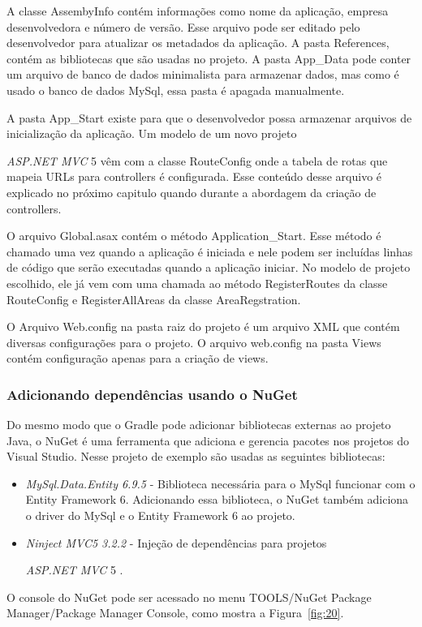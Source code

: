 \documentclass[a4paper,12pt]{article}
\newcommand{\anmvc} {
\sigla{ASP.NET MVC} 5
}
\newcommand{\sigla}[1] {
	\textit{#1}
}
\newcommand{\lib}[1] {
	\textit{#1}
}
\begin{document}
A classe AssembyInfo contém informações como nome da aplicação, empresa desenvolvedora e número de versão. Esse arquivo pode ser editado pelo desenvolvedor para atualizar os metadados da aplicação. A pasta References, contém as bibliotecas que são usadas no projeto. A pasta App\_Data pode conter um arquivo de banco de dados minimalista para armazenar dados, mas como é usado o banco de dados MySql, essa pasta é apagada manualmente.

A pasta App\_Start existe para que o desenvolvedor possa armazenar arquivos de inicialização da aplicação. Um modelo de um novo projeto \anmvc vêm com a classe RouteConfig onde a tabela de rotas que mapeia URLs para controllers é configurada. Esse conteúdo desse arquivo é explicado no próximo capitulo quando durante a abordagem da criação de controllers.

O arquivo Global.asax contém o método Application\_Start. Esse método é chamado uma vez quando a aplicação é iniciada e nele podem ser incluídas linhas de código que serão executadas quando a aplicação iniciar. No modelo de projeto escolhido, ele já vem com uma chamada ao método RegisterRoutes da classe RouteConfig e RegisterAllAreas da classe AreaRegstration.

O Arquivo Web.config na pasta raiz do projeto é um arquivo XML que contém diversas configurações para o projeto. O arquivo web.config na pasta Views contém configuração apenas para a criação de views.

\subsubsection{Adicionando dependências usando o NuGet}

Do mesmo modo que o Gradle pode adicionar bibliotecas externas ao projeto Java, o NuGet é uma ferramenta que adiciona e gerencia pacotes nos projetos do Visual Studio. Nesse projeto de exemplo são usadas as seguintes bibliotecas:

\begin{itemize}
  \item \lib{MySql.Data.Entity 6.9.5} - Biblioteca necessária para o MySql funcionar com o Entity Framework 6. Adicionando essa biblioteca, o NuGet também adiciona o driver do MySql e o Entity Framework 6 ao projeto.
  \item \lib{Ninject MVC5 3.2.2} - Injeção de dependências para projetos \anmvc. 
\end{itemize}

O console do NuGet pode ser acessado no menu TOOLS/NuGet Package Manager/Package Manager Console, como mostra a Figura~\ref{fig:20}.
\end{document}
